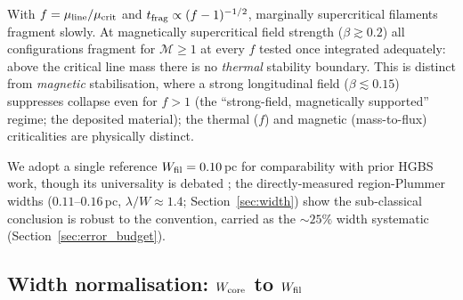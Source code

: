 \documentclass[usenatbib,twoside,twocolumn]{mnras}
\begin{document}
With $f=\mu_{\rm line}/\mu_{\rm crit}$ and $t_{\rm frag}\propto(f-1)^{-1/2}$, marginally supercritical filaments fragment slowly. At magnetically supercritical field strength ($\beta\gtrsim0.2$) all configurations fragment for $\mathcal{M}\geq1$ at every $f$ tested once integrated adequately: above the critical line mass there is no \emph{thermal} stability boundary. This is distinct from \emph{magnetic} stabilisation, where a strong longitudinal field ($\beta\lesssim0.15$) suppresses collapse even for $f>1$ (the ``strong-field, magnetically supported'' regime; the deposited material); the thermal ($f$) and magnetic (mass-to-flux) criticalities are physically distinct.

We adopt a single reference $W_{\rm fil}=0.10$\,pc for comparability with prior HGBS work, though its universality is debated \citep{Panopoulou2017,Panopoulou2022}; the directly-measured region-Plummer widths ($0.11$--$0.16$\,pc, $\lambda/W\approx1.4$; Section~\ref{sec:width}) show the sub-classical conclusion is robust to the convention, carried as the $\sim25\%$ width systematic (Section~\ref{sec:error_budget}).

\subsection{Width normalisation: $W_{\rm core}$ to $W_{\rm fil}$}
\label{sec:width_correction}
\end{document}
